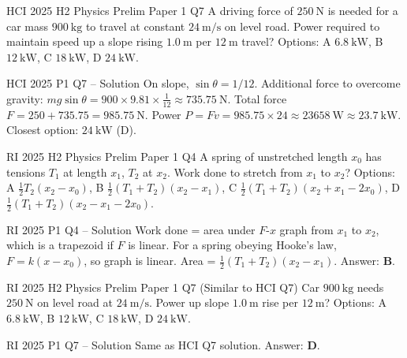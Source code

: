 \documentclass[11pt]{beamer}
\begin{document}
\begin{frame}[shrink=15]{HCI 2025 H2 Physics Prelim Paper 1 Q7}
A driving force of $250\ \mathrm{N}$ is needed for a car mass $900\ \mathrm{kg}$ to travel at constant $24\ \mathrm{m/s}$ on level road. Power required to maintain speed up a slope rising $1.0\ \mathrm{m}$ per $12\ \mathrm{m}$ travel?
Options: A $6.8\ \mathrm{kW}$, B $12\ \mathrm{kW}$, C $18\ \mathrm{kW}$, D $24\ \mathrm{kW}$.
\end{frame}

\begin{frame}{HCI 2025 P1 Q7 – Solution}
On slope, $\sin\theta = 1/12$. Additional force to overcome gravity: $mg\sin\theta = 900\times9.81\times\frac{1}{12} \approx 735.75\ \mathrm{N}$.
Total force $F = 250 + 735.75 = 985.75\ \mathrm{N}$.
Power $P = Fv = 985.75\times24 \approx 23658\ \mathrm{W} \approx 23.7\ \mathrm{kW}$.
Closest option: $24\ \mathrm{kW}$ (D).
\end{frame}

\begin{frame}[shrink=15]{RI 2025 H2 Physics Prelim Paper 1 Q4}
A spring of unstretched length $x_0$ has tensions $T_1$ at length $x_1$, $T_2$ at $x_2$. Work done to stretch from $x_1$ to $x_2$?
Options: A $\frac12 T_2(x_2-x_0)$, B $\frac12 (T_1+T_2)(x_2-x_1)$, C $\frac12 (T_1+T_2)(x_2+x_1-2x_0)$, D $\frac12 (T_1+T_2)(x_2-x_1-2x_0)$.
\end{frame}

\begin{frame}{RI 2025 P1 Q4 – Solution}
Work done = area under $F$-$x$ graph from $x_1$ to $x_2$, which is a trapezoid if $F$ is linear. For a spring obeying Hooke's law, $F = k(x-x_0)$, so graph is linear. Area = $\frac12 (T_1 + T_2)(x_2 - x_1)$.
Answer: \textbf{B}.
\end{frame}

\begin{frame}[shrink=15]{RI 2025 H2 Physics Prelim Paper 1 Q7}
(Similar to HCI Q7) Car $900\ \mathrm{kg}$ needs $250\ \mathrm{N}$ on level road at $24\ \mathrm{m/s}$. Power up slope $1.0\ \mathrm{m}$ rise per $12\ \mathrm{m}$?
Options: A $6.8\ \mathrm{kW}$, B $12\ \mathrm{kW}$, C $18\ \mathrm{kW}$, D $24\ \mathrm{kW}$.
\end{frame}

\begin{frame}{RI 2025 P1 Q7 – Solution}
Same as HCI Q7 solution. Answer: \textbf{D}.
\end{frame}
\end{document}

